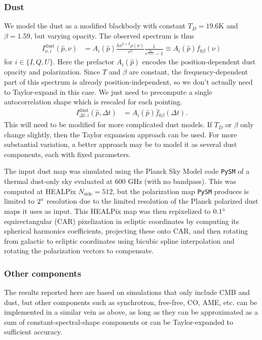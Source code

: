 \documentclass{article}
\newcommand{\code}[1]{\texttt{#1}}
\begin{document}
\subsubsection{Dust}
\label{sect:dust}
We model the dust as a modified blackbody with constant
$T_D=19.6$K and $\beta=1.59$, but varying opacity. The observed spectrum is thus
\begin{align}
I^\textrm{dust}_{\nu,i}(\hat p,\nu) &= A_i(\hat p) \frac{h\nu^{3+\beta}\rho(\nu)}{c^2}\frac{1}{e^{\frac{h\nu}{k_BT_D}}-1} \equiv A_i(\hat p) f_{0\beta}(\nu)
\end{align}
for $i \in \{I,Q,U\}$. Here the prefactor $A_i(\hat p)$ encodes the position-dependent
dust opacity and polarization.
Since $T$ and $\beta$ are constant, the frequency-dependent part of this spectrum is
already position-independent, so we don't actually need to Taylor-expand in this case.
We just need to precompute a single autocorrelation shape which is rescaled for each
pointing.
\begin{align}
I^\textrm{dust}_{\Delta t,i}(\hat p,\Delta t) &= A_i(\hat p) \bar f_{0\beta}(\Delta t).
\end{align}
This will need to be modified for more complicated dust models. If $T_D$ or $\beta$
only change slightly, then the Taylor expansion approach can be used. For more
substantial variation, a better approach may be to model it as several dust components,
each with fixed parameters.

The input dust map was simulated using the Planck Sky Model \cite{psm} code \code{PySM}
of a thermal dust-only sky evaluated at 600 GHz (with no bandpass).
This was computed at HEALPix $N_\textrm{side} = 512$, but the polarization
map \code{PySM} produces is limited to $2\degree$ resolution due to the limited
resolution of the Planck polarized dust maps it uses as input. This HEALPix map
was then repixelized to $0.1\degree$ equirectangular (CAR) pixelization in
ecliptic coordinates by computing its spherical harmonics coefficients,
projecting these onto CAR, and then rotating from galactic to ecliptic coordinates
using bicubic spline interpolation and rotating the polarization vectors to compensate.

\subsubsection{Other components}
The results reported here are based on simulations that only include CMB and dust,
but other components such as synchrotron, free-free, CO, AME, etc. can be implemented
in a similar vein as above, as long as they can be approximated as a sum of
constant-spectral-shape components or can be Taylor-expanded to sufficient accuracy.
\end{document}
